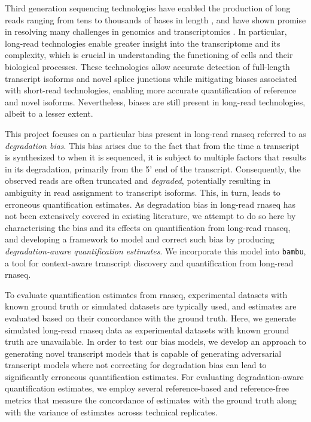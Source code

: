 Third generation sequencing technologies have enabled the production of long reads ranging from tens to thousands of bases in length \cite{Pollard2018}, and have shown promise in resolving many challenges in genomics and transcriptomics \cite{Bolisetty2015, Byrne2017, DeCoster2019, Liu2019, Mantere2019, Nurk2021}. In particular, long-read technologies enable greater insight into the transcriptome and its complexity, which is crucial in understanding the functioning of cells and their biological processes. These technologies allow accurate detection of full-length transcript isoforms and novel splice junctions while mitigating biases associated with short-read technologies, enabling more accurate quantification of reference and novel isoforms. Nevertheless, biases are still present in long-read technologies, albeit to a lesser extent. 

This project focuses on a particular bias present in long-read \gls{rnaseq} referred to as \textit{degradation bias}. This bias arises due to the fact that from the time a transcript is synthesized to when it is sequenced, it is subject to multiple factors that results in its degradation, primarily from the 5' end of the transcript. Consequently, the observed reads are often truncated and \textit{degraded}, potentially resulting in ambiguity in read assignment to transcript isoforms. This, in turn, leads to erroneous quantification estimates. As degradation bias in long-read \gls{rnaseq} has not been extensively covered in existing literature, we attempt to do so here by characterising the bias and its effects on quantification from long-read \gls{rnaseq}, and developing a framework to model and correct such bias by producing \textit{degradation-aware quantification estimates}. We incorporate this model into \texttt{bambu}, a tool for context-aware transcript discovery and quantification from long-read \gls{rnaseq}. 

To evaluate quantification estimates from \gls{rnaseq}, experimental datasets with known ground truth or simulated datasets are typically used, and estimates are evaluated based on their concordance with the ground truth. Here, we generate simulated long-read \gls{rnaseq} data as experimental datasets with known ground truth are unavailable. In order to test our bias models, we develop an approach to generating novel transcript models that is capable of generating adversarial transcript models where not correcting for degradation bias can lead to significantly erroneous quantification estimates. For evaluating degradation-aware quantification estimates, we employ several reference-based and reference-free metrics that measure the concordance of estimates with the ground truth along with the variance of estimates acrosss technical replicates.   

